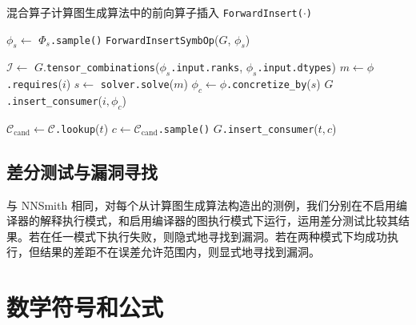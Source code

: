 \begin{algorithm}
    \caption{混合算子计算图生成算法中的前向算子插入 \texttt{ForwardInsert($\cdot$)}}
    \label{algo:hygen}


 {
     {
        $\phi_s \gets$ $\Phi_s$\texttt{.sample()}\;
        \texttt{ForwardInsertSymbOp}($G$, $\phi_s$)\;
    }
}

 {
    $\mathcal{I} \gets$ $G$.\texttt{tensor\_combinations}($\phi_s$\texttt{.input.ranks}, $\phi_s$\texttt{.input.dtypes})\;
     {
        $m \gets \phi$\texttt{.requires}($i$)\;
        $s \gets$ \texttt{solver.solve}($m$)\;
         {
            $\phi_c \gets \phi$\texttt{.concretize\_by}($s$)\;
            $G$\texttt{.insert\_consumer}($i, \phi_c$)\;
        }
    }
}

 {
     {
        $\mathcal{C}_\text{cand} \gets \mathcal{C}$\texttt{.lookup}($t$)\;
        $c \gets \mathcal{C}_\text{cand}$\texttt{.sample()}\;
        $G$\texttt{.insert\_consumer}($t, c$)\;
    }
}

\end{algorithm}

\section{差分测试与漏洞寻找}

与 NNSmith 相同，对每个从计算图生成算法构造出的测例，我们分别在不启用编译器的解释执行模式，和启用编译器的图执行模式下运行，运用差分测试比较其结果。若在任一模式下执行失败，则隐式地寻找到漏洞。若在两种模式下均成功执行，但结果的差距不在误差允许范围内，则显式地寻找到漏洞。

\iffalse
\chapter{数学符号和公式}

